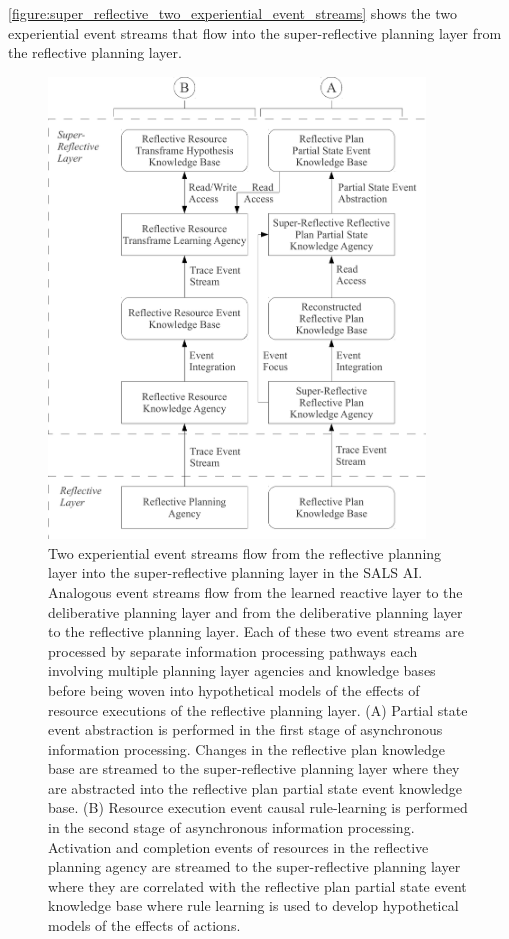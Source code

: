 {\mbox{\autoref{figure:super_reflective_two_experiential_event_streams}}}
shows the two experiential event streams that flow into the
super-reflective planning layer from the reflective planning layer.
\begin{figure}
\centering
\includegraphics[width=10cm]{gfx/super_reflective_two_experiential_event_streams}
\caption[Two experiential event streams flow from the reflective
  planning layer into the super-reflective planning layer in the SALS
  AI.]{Two experiential event streams flow from the reflective
  planning layer into the super-reflective planning layer in the SALS
  AI.  Analogous event streams flow from the learned reactive layer to
  the deliberative planning layer and from the deliberative planning
  layer to the reflective planning layer.  Each of these two event
  streams are processed by separate information processing pathways
  each involving multiple planning layer agencies and knowledge bases
  before being woven into hypothetical models of the effects of
  resource executions of the reflective planning layer.  (A) Partial
  state event abstraction is performed in the first stage of
  asynchronous information processing.  Changes in the reflective plan
  knowledge base are streamed to the super-reflective planning layer
  where they are abstracted into the reflective plan partial state
  event knowledge base.  (B) Resource execution event causal
  rule-learning is performed in the second stage of asynchronous
  information processing.  Activation and completion events of
  resources in the reflective planning agency are streamed to the
  super-reflective planning layer where they are correlated with the
  reflective plan partial state event knowledge base where rule
  learning is used to develop hypothetical models of the effects of
  actions.}
\label{figure:super_reflective_two_experiential_event_streams}
\end{figure}

